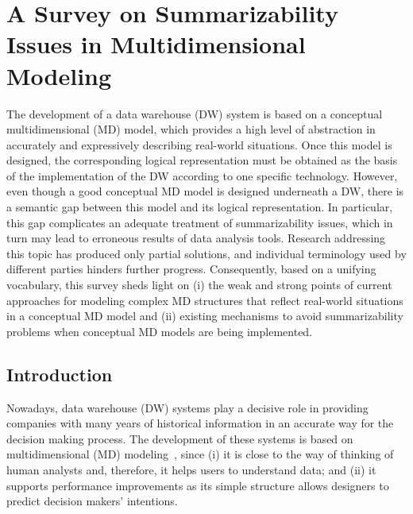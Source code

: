 %
%
%


\chapter{A Survey on Summarizability Issues in Multidimensional Modeling}
\label{a1} %



The development of a data warehouse (DW) system is based on a
conceptual multidimensional (MD) model, which provides a high level
of abstraction in accurately and expressively describing real-world
situations. Once this model is designed, the corresponding logical
representation must be obtained as the basis of the implementation
of the DW according to one specific technology. However, even though
a good conceptual MD model is designed underneath a DW, there is a
semantic gap between this model and its logical representation. In
particular, this gap complicates an adequate treatment of
summarizability issues, which in turn may lead to erroneous results
of data analysis tools. Research addressing this topic has produced
only partial solutions, and individual terminology used by different
parties hinders further progress. Consequently, based on a unifying
vocabulary, this survey sheds light on (i) the weak and strong
points of current approaches for modeling complex MD structures that
reflect real-world situations in a conceptual MD model and (ii)
existing mechanisms to avoid summarizability problems when
conceptual MD models are being implemented.



\section{Introduction}
\label{a1:sec:intro} Nowadays, data warehouse (DW) systems play a
decisive role in providing companies with many years of historical
information in an accurate way for the decision making process. The
development of these systems is based on multidimensional (MD)
modeling~\cite{book/Jarke/DW}, since (i) it is close to the way of
thinking of human analysts and, therefore, it helps users to
understand data; and (ii) it supports performance improvements as
its simple structure allows designers to predict decision makers'
intentions.

